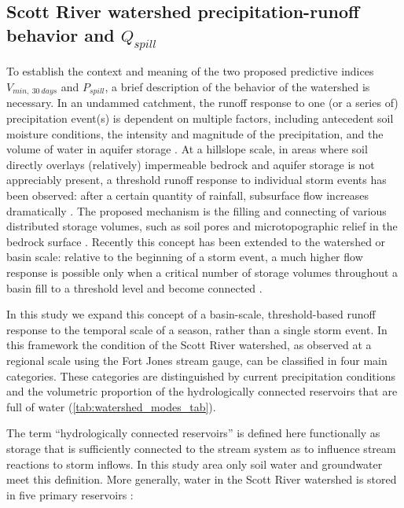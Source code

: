 \documentclass[hess, manuscript]{copernicus}
\begin{document}
\subsection{\texorpdfstring{Scott River watershed precipitation-runoff
behavior and
\(Q_{spill}\)}{Scott River watershed precipitation-runoff behavior and Q\_\{spill\}}}

To establish the context and meaning of the two proposed predictive
indices \(V_{min,~30~days}\) and \(P_{spill}\), a brief description of
the behavior of the watershed is necessary. In an undammed catchment,
the runoff response to one (or a series of) precipitation event(s) is
dependent on multiple factors, including antecedent soil moisture
conditions, the intensity and magnitude of the precipitation, and the
volume of water in aquifer storage \citep{Tarboton2003}. At a hillslope
scale, in areas where soil directly overlays (relatively) impermeable
bedrock and aquifer storage is not appreciably present, a threshold
runoff response to individual storm events has been observed: after a
certain quantity of rainfall, subsurface flow increases dramatically
\citep{Tromp-VanMeerveld2006}. The proposed mechanism is the filling and
connecting of various distributed storage volumes, such as soil pores
and microtopographic relief in the bedrock surface
\citep{Tromp-VanMeerveld2006}. Recently this concept has been extended
to the watershed or basin scale: relative to the beginning of a storm
event, a much higher flow response is possible only when a critical
number of storage volumes throughout a basin fill to a threshold level
and become connected \citep{McDonnell2021}.

In this study we expand this concept of a basin-scale, threshold-based
runoff response to the temporal scale of a season, rather than a single
storm event. In this framework the condition of the Scott River
watershed, as observed at a regional scale using the Fort Jones stream
gauge, can be classified in four main categories. These categories are
distinguished by current precipitation conditions and the volumetric
proportion of the hydrologically connected reservoirs that are full of
water (\autoref{tab:watershed_modes_tab}).

The term ``hydrologically connected reservoirs'' is defined here
functionally as storage that is sufficiently connected to the stream
system as to influence stream reactions to storm inflows. In this study
area only soil water and groundwater meet this definition. More
generally, water in the Scott River watershed is stored in five primary
reservoirs \citep{Harter2008}:
\end{document}
